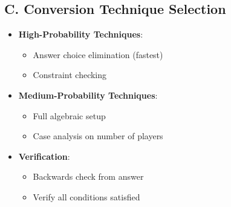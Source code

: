 \documentclass[12pt]{article}
\begin{document}
\begin{tacticalbox}
\subsection*{C. Conversion Technique Selection}
\begin{itemize}[leftmargin=*]
    \item \textbf{High-Probability Techniques}:
    \begin{itemize}
        \item Answer choice elimination (fastest)
        \item Constraint checking
    \end{itemize}
    \item \textbf{Medium-Probability Techniques}:
    \begin{itemize}
        \item Full algebraic setup
        \item Case analysis on number of players
    \end{itemize}
    \item \textbf{Verification}:
    \begin{itemize}
        \item Backwards check from answer
        \item Verify all conditions satisfied
    \end{itemize}
\end{itemize}
\end{tacticalbox}
\end{document}

